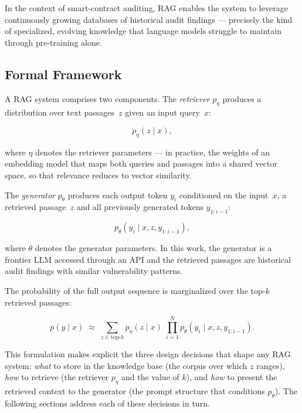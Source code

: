 In the context of smart-contract auditing, RAG enables the system to leverage continuously growing databases of historical audit findings --- precisely the kind of specialized, evolving knowledge that language models struggle to maintain through pre-training alone.

\subsection{Formal Framework}
\label{subsec:rag-formal}

A RAG system comprises two components. The \emph{retriever} $p_\eta$ produces a distribution over text passages~$z$ given an input query~$x$:

\begin{equation}
    p_\eta(z \mid x),
    \label{eq:retriever}
\end{equation}

where $\eta$ denotes the retriever parameters --- in practice, the weights of an embedding model that maps both queries and passages into a shared vector space, so that relevance reduces to vector similarity.

The \emph{generator} $p_\theta$ produces each output token $y_i$ conditioned on the input~$x$, a retrieved passage~$z$ and all previously generated tokens $y_{1:i-1}$:

\begin{equation}
    p_\theta(y_i \mid x, z, y_{1:i-1}),
    \label{eq:generator}
\end{equation}

where $\theta$ denotes the generator parameters. In this work, the generator is a frontier LLM accessed through an API and the retrieved passages are historical audit findings with similar vulnerability patterns.

The probability of the full output sequence is marginalized over the top-$k$ retrieved passages:

\begin{equation}
    p(y \mid x) \;\approx\; \sum_{z \in \text{top-}k}
    p_\eta(z \mid x)\;\prod_{i=1}^{N}
    p_\theta(y_i \mid x, z, y_{1:i-1}).
    \label{eq:rag-marginal}
\end{equation}

This formulation makes explicit the three design decisions that shape any RAG system: \emph{what} to store in the knowledge base (the corpus over which $z$ ranges), \emph{how} to retrieve (the retriever $p_\eta$ and the value of $k$), and \emph{how} to present the retrieved context to the generator (the prompt structure that conditions $p_\theta$). The following sections address each of these decisions in turn.

